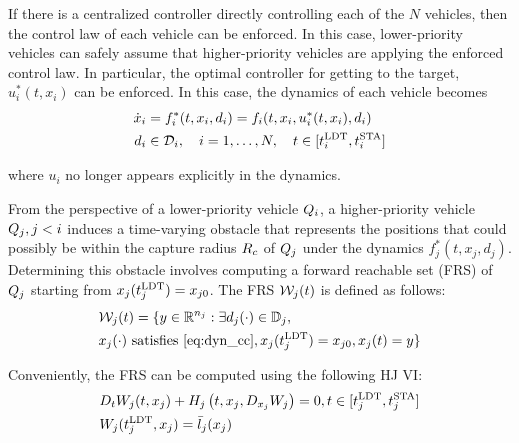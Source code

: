 If there is a centralized controller directly controlling each of the $N$ vehicles, then the control law of each vehicle can be enforced. In this case, lower-priority vehicles can safely assume that higher-priority vehicles are applying the enforced control law. In particular, the optimal controller for getting to the target, $u^*_i(t, x_i)$ can be enforced. In this case, the dynamics of each vehicle becomes 
\vspace{-0.3em}
\begin{equation}
\label{eq:dyn_cc}
\begin{aligned}
\dot x_i &= f^*_i (t, x_i, d_i) = f_i(t, x_i, u^*_i(t,x_i), d_i) \\
d_i &\in \dset_i, \quad i = 1,\ldots, N, \quad t \in [\ldt_i, \sta_i]
\end{aligned}
\end{equation}

\noindent where $u_i$ no longer appears explicitly in the dynamics.

From the perspective of a lower-priority vehicle $Q_i$, a higher-priority vehicle $Q_j, j < i$ induces a time-varying obstacle that represents the positions that could possibly be within the capture radius $R_c$ of $Q_j$ under the dynamics $f^*_j(t, x_j, d_j)$. Determining this obstacle involves computing a forward reachable set (FRS) of $Q_j$ starting from $x_j(t^\text{LDT}_j) = x_{j0}$. The FRS $\mathcal{W}_j(t)$ is defined as follows:
\vspace{-0.3em}
\begin{equation}
\label{eq:FRS1}
\begin{aligned}
&\frs_j(t) = \{y \in \R^{n_j}: \exists d_j(\cdot) \in \dfset_j, \\
&x_j(\cdot) \text{ satisfies \eqref{eq:dyn_cc}}, x_j(\ldt_j) = x_{j0}, x_j(t) = y\}
\end{aligned}
\end{equation}

Conveniently, the FRS can be computed using the following HJ VI:
\vspace{-0.4em}
\begin{equation}
\label{eq:FRS_HJIVI}
\begin{aligned}
&D_t W_j(t, x_j) + H_j\left(t, x_j, D_{x_j} W_j\right) = 0, t \in [\ldt_j, \sta_j]\\
&W_j(\ldt_j, x_j) = \bar l_j(x_j) \\
\end{aligned}
\end{equation}

